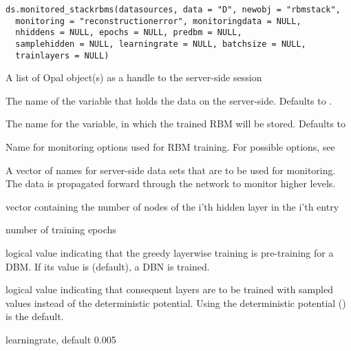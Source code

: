 %
\begin{Usage}
\begin{verbatim}
ds.monitored_stackrbms(datasources, data = "D", newobj = "rbmstack",
  monitoring = "reconstructionerror", monitoringdata = NULL,
  nhiddens = NULL, epochs = NULL, predbm = NULL,
  samplehidden = NULL, learningrate = NULL, batchsize = NULL,
  trainlayers = NULL)
\end{verbatim}
\end{Usage}
%
\begin{Arguments}
\begin{ldescription}
\item[\code{datasources}] A list of Opal object(s) as a handle to the server-side session

\item[\code{data}] The name of the variable that holds the data on the server-side.
Defaults to .

\item[\code{newobj}] The name for the variable, in which the trained RBM will be stored.
Defaults to 

\item[\code{monitoring}] Name for monitoring options used for RBM training.
For possible options, see 

\item[\code{monitoringdata}] A vector of names for server-side data sets that are to be used for
monitoring. The data is propagated forward through the
network to monitor higher levels.

\item[\code{nhiddens}] vector containing the number of nodes of the i'th hidden layer in
the i'th entry

\item[\code{epochs}] number of training epochs

\item[\code{predbm}] logical value indicating that the greedy layerwise training is
pre-training for a DBM.
If its value is  (default), a DBN is trained.

\item[\code{samplehidden}] logical value indicating that consequent layers are to be trained
with sampled values instead of the deterministic potential.
Using the deterministic potential () is the default.

\item[\code{learningrate}] learningrate, default 0.005


\end{ldescription}
\end{Arguments}
